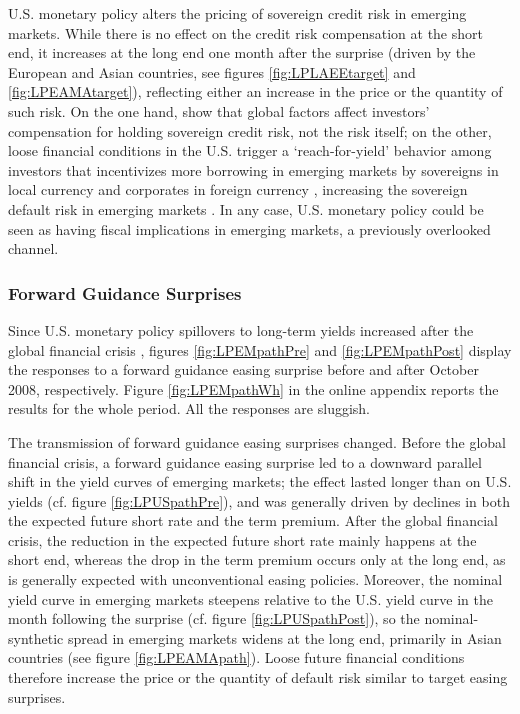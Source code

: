 \documentclass[a4paper, 12pt]{article}
\begin{document}
U.S. monetary policy alters the pricing of sovereign credit risk in emerging markets. While there is no effect on the credit risk compensation at the short end, it increases at the long end one month after the surprise (driven by the European and Asian countries, see figures \ref{fig:LPLAEEtarget} and \ref{fig:LPEAMAtarget}), reflecting either an increase in the price or the quantity of such risk. On the one hand, \cite{JeanneretSouissi:2016} show that global factors affect investors’ compensation for holding sovereign credit risk, not the risk itself; on the other, loose financial conditions in the U.S. trigger a `reach-for-yield' behavior among investors \citep{HausmanWongswan:2011} that incentivizes more borrowing in emerging markets by sovereigns in local currency \citep{BigioNunoPassadore:2018} and corporates in foreign currency \citep{Turner:2014}, increasing the sovereign default risk in emerging markets \citep{DuSchreger:2022RFS}. In any case, U.S. monetary policy could be seen as having fiscal implications in emerging markets, a previously overlooked channel. 

\subsubsection{Forward Guidance Surprises}
Since U.S. monetary policy spillovers to long-term yields increased after the global financial crisis \citep{Albaglietal:2019}, figures \ref{fig:LPEMpathPre} and \ref{fig:LPEMpathPost} display the responses to a forward guidance easing surprise before and after October 2008, respectively. Figure \ref{fig:LPEMpathWh} in the online appendix reports the results for the whole period. All the responses are sluggish. 

The transmission of forward guidance easing surprises changed. Before the global financial crisis, a forward guidance easing surprise led to a downward parallel shift in the yield curves of emerging markets; the effect lasted longer than on U.S. yields (cf. figure \ref{fig:LPUSpathPre}), and was generally driven by declines in both the expected future short rate and the term premium. After the global financial crisis, the reduction in the expected future short rate mainly happens at the short end, whereas the drop in the term premium occurs only at the long end, as is generally expected with unconventional easing policies. Moreover, the nominal yield curve in emerging markets steepens relative to the U.S. yield curve in the month following the surprise (cf. figure \ref{fig:LPUSpathPost}), so the nominal-synthetic spread in emerging markets widens at the long end, primarily in Asian countries (see figure \ref{fig:LPEAMApath}). Loose future financial conditions therefore increase the price or the quantity of default risk similar to target easing surprises. 
\end{document}
